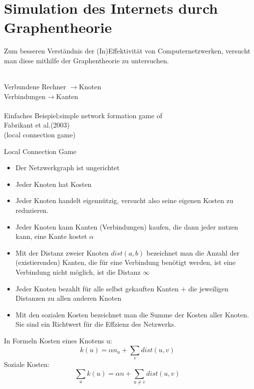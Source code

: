 \documentclass[mathserif, aspectratio=169]{beamer}
\begin{document}
\section{Simulation des Internets durch Graphentheorie}
\begin{frame}
Zum besseren Verst\"andnis der (In)Effektivit\"at von Computernetzwerken, versucht man diese mithilfe der Graphentheorie zu untersuchen.
\begin{tabbing}
\hspace{5cm}\=\\
Verbundene Rechner \>$\longrightarrow$Knoten\\
Verbindungen\>$\longrightarrow$Kanten\\\\
Einfaches Beispiel:\>simple network formation game of\\\> Fabrikant et al.(2003) \\\>(local connection game)
\end{tabbing}
\end{frame}
\begin{frame}
\begin{block}
{Local Connection Game}
\begin{itemize}
        \item Der Netzwerkgraph ist ungerichtet
        \item Jeder Knoten hat Kosten
        \item Jeder Knoten handelt eigenn\"utzig, versucht also seine eigenen Kosten zu reduzieren.
        \item Jeder Knoten kann Kanten (Verbindungen) kaufen, die dann jeder nutzen kann, eine Kante kostet $\alpha$
        \item Mit der Distanz zweier Knoten $dist(a,b)$ bezeichnet man die Anzahl der (existierenden) Kanten, die f\"ur eine Verbindung ben\"otigt werden, ist eine Verbindung nicht m\"oglich, ist die Distanz $\infty$
        \item Jeder Knoten bezahlt f\"ur alle selbst gekauften Kanten $+$ die jeweiligen Distanzen zu allen anderen Knoten
        \item Mit den sozialen Kosten bezeichnet man die Summe der Kosten aller Knoten. Sie sind ein Richtwert f\"ur die Effzienz des Netzwerks.
\end{itemize}
\end{block}
\end{frame}

\begin{frame}
\begin{block}
{In Formeln}
Kosten eines Knotens u:
\[k(u)=\alpha n_u + {\sum}_v dist(u,v)\]
Soziale Kosten:
\[{\sum}_u k(u)= \alpha n + {\sum}_{u\not=v} dist (u,v)\]
\end{block}
\end{frame}
\end{document}
